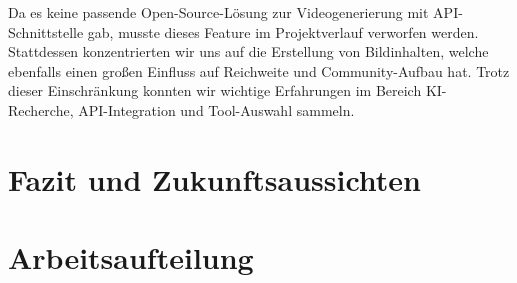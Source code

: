 \documentclass[a4paper,12pt]{article}
\begin{document}
Da es keine passende Open-Source-Lösung zur Videogenerierung mit API-Schnittstelle gab, musste dieses Feature im Projektverlauf verworfen werden. Stattdessen konzentrierten wir uns auf die Erstellung von Bildinhalten, welche ebenfalls einen großen Einfluss auf Reichweite und Community-Aufbau hat. Trotz dieser Einschränkung konnten wir wichtige Erfahrungen im Bereich KI-Recherche, API-Integration und Tool-Auswahl sammeln.


\section{Fazit und Zukunftsaussichten}
\section{Arbeitsaufteilung}
\end{document}
